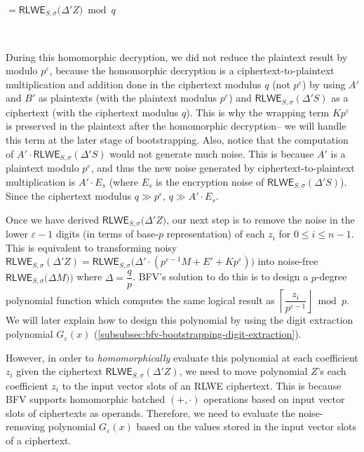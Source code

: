 $ $

$ = \textsf{RLWE}_{S, \sigma}\bm(\Delta' Z\bm) \bmod q$

$ $

During this homomorphic decryption, we did not reduce the plaintext result by modulo $p^\varepsilon$, because the homomorphic decryption is a ciphertext-to-plaintext multiplication and addition done in the ciphertext modulus $q$ (not $p^{\varepsilon}$) by using $A'$ and $B'$ as plaintexts (with the plaintext modulus $p^e$) and $\textsf{RLWE}_{S, \sigma}(\Delta' S)$ as a ciphertext (with the ciphertext modulus $q$). This is why the wrapping term $Kp^\varepsilon$ is preserved in the plaintext after the homomorphic decryption-- we will handle this term at the later stage of bootstrapping. Also, notice that the computation of $A'\cdot \textsf{RLWE}_{S, \sigma}(\Delta' S)$ would not generate much noise. This is because $A'$ is a plaintext modulo $p^\varepsilon$, and thus the new noise generated by ciphertext-to-plaintext multiplication is $A' \cdot E_s$ (where $E_s$ is the encryption noise of $\textsf{RLWE}_{S, \sigma}(\Delta' S)$). Since the ciphertext modulus $q \gg p^\varepsilon$, $q \gg A' \cdot E_s$. 

Once we have derived $\textsf{RLWE}_{S, \sigma}\bm(\Delta' Z\bm)$, our next step is to remove the noise in the lower $\varepsilon-1$ digits (in terms of base-$p$ representation) of each $z_i$ for $0 \leq i \leq n - 1$. This is equivalent to transforming noisy $\textsf{RLWE}_{S, \sigma}(\Delta' Z) = \textsf{RLWE}_{S, \sigma}\bm(\Delta' \cdot (p^{\varepsilon-1} M  + E' + Kp^\varepsilon)\bm)$ into noise-free $\textsf{RLWE}_{S, \sigma}\bm (\Delta M)\bm )$ where $\Delta = \dfrac{q}{p}$. BFV's solution to do this is to design a $p$-degree polynomial function which computes the same logical result as $\left\lceil \dfrac{z_i}{p^{\varepsilon-1}} \right\rfloor \bmod p$. We will later explain how to design this polynomial by using the digit extraction polynomial $G_\varepsilon(x)$ (\autoref{subsubsec:bfv-bootstrapping-digit-extraction}). 


However, in order to \textit{homomorphically} evaluate this polynomial at each coefficient $z_i$ given the ciphertext $\textsf{RLWE}_{S, \sigma}(\Delta' Z)$, we need to move polynomial $Z$'s each coefficient $z_i$ to the input vector slots of an RLWE ciphertext. This is because BFV supports homomorphic batched $(+, \cdot)$ operations based on input vector slots of ciphertexts as operands. Therefore, we need to evaluate the noise-removing polynomial $G_\varepsilon(x)$ based on the values stored in the input vector slots of a ciphertext. 

